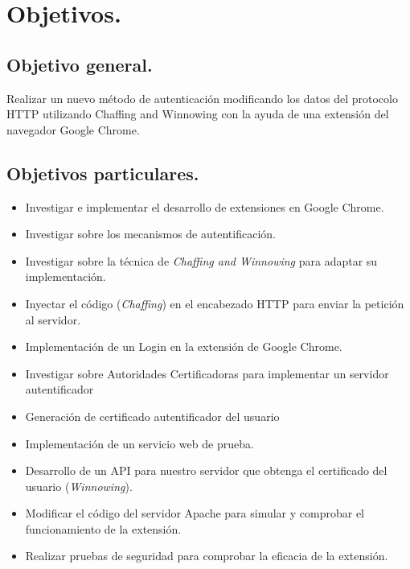 \documentclass[12pt, a4paper, titlepage]{report}
\begin{document}
		
	\section{Objetivos.}
		\subsection{Objetivo general. }
			Realizar un nuevo método de autenticación modificando los datos del protocolo HTTP utilizando Chaffing and Winnowing con la ayuda de una extensión del navegador Google Chrome.
		\subsection{Objetivos particulares.}
			\begin{itemize}
				\item Investigar e implementar el desarrollo de extensiones en Google Chrome.
				\item Investigar sobre los mecanismos de autentificación.
				\item Investigar sobre la técnica de \textit{Chaffing and Winnowing} para adaptar su implementación.
				\item Inyectar el código (\textit{Chaffing}) en el encabezado HTTP para enviar la petición al servidor. 
				\item Implementación de un Login en la extensión de Google Chrome.
				\item Investigar sobre Autoridades Certificadoras para implementar un servidor autentificador
				\item Generación de certificado autentificador del usuario
				\item Implementación de un servicio web de prueba.
				\item Desarrollo de un API para nuestro servidor que obtenga el certificado del usuario (\textit{Winnowing}).
				\item Modificar el código del servidor Apache para simular y comprobar el funcionamiento de la extensión. 
				\item Realizar pruebas de seguridad para comprobar la eficacia de la extensión. 
			\end{itemize}
			
\end{document}
